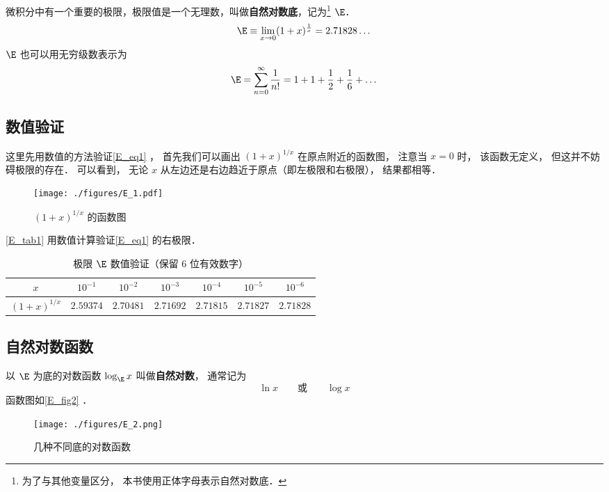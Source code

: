 
微积分中有一个重要的极限，极限值是一个无理数，叫做\textbf{自然对数底}，记为\footnote{为了与其他变量区分， 本书使用正体字母表示自然对数底．} $\E$．
\begin{equation}\label{E_eq1}
\E \equiv \lim_{x \to 0} (1 + x)^{\frac{1}{x}} = 2.71828\dots
\end{equation}
$\E$ 也可以用无穷级数表示为%
\begin{equation}\label{E_eq2}
\E = \sum_{n=0}^\infty \frac{1}{n!} = 1 + 1 + \frac{1}{2} + \frac{1}{6} + \dots
\end{equation}

\subsection{数值验证}
这里先用数值的方法验证\autoref{E_eq1} ， 首先我们可以画出 $(1+x)^{1/x}$ 在原点附近的函数图， 注意当 $x = 0$ 时， 该函数无定义， 但这并不妨碍极限的存在． 可以看到， 无论 $x$ 从左边还是右边趋近于原点（即左极限和右极限）， 结果都相等．
\begin{figure}[ht]
\centering
\texttt{[image: ./figures/E\_1.pdf]}
\caption{$(1+x)^{1/x}$ 的函数图} \label{E_fig1}
\end{figure}

\autoref{E_tab1} 用数值计算验证\autoref{E_eq1} 的右极限．
\begin{table}[ht]
\centering
\caption{极限 $\E$ 数值验证（保留 6 位有效数字）}\label{E_tab1}
\begin{tabular}{|c|c|c|c|c|c|c|}
\hline
$x$ & $10^{-1}$ & $10^{-2}$ & $10^{-3}$ & $10^{-4}$ & $10^{-5}$ & $10^{-6}$ \\
\hline
$(1 + x)^{1/x}$ & $2.59374$ & $2.70481$ & $2.71692$ & $2.71815$ & $2.71827$ & $2.71828$ \\
\hline
\end{tabular}
\end{table}

\subsection{自然对数函数}
以 $\E$ 为底的对数函数 $\log_{\E} x$ 叫做\textbf{自然对数}， 通常记为
\begin{equation}
\ln x \qquad \text{或} \qquad \log x
\end{equation}
函数图如\autoref{E_fig2} ．
\begin{figure}[ht]
\centering
\texttt{[image: ./figures/E\_2.png]}
\caption{几种不同底的对数函数} \label{E_fig2}
\end{figure}
